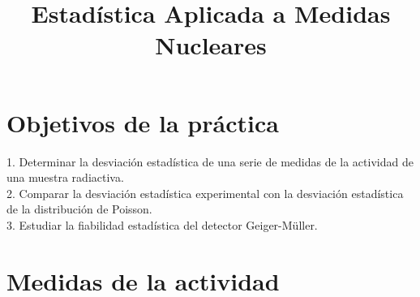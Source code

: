\documentclass[a4paper,12pt,spanish]{article}
\begin{document}
	
	
	\title{Estadística Aplicada a Medidas Nucleares}
	
	\date{}
	
	\maketitle
	
	
	\section{Objetivos de la práctica}
	
	\vspace{\baselineskip}
	
	1. Determinar la desviación estadística de una serie de medidas de la actividad de una muestra radiactiva.\\
	
	2. Comparar la desviación estadística experimental con la desviación estadística de la distribución de Poisson.\\

	3. Estudiar la fiabilidad estadística del detector Geiger-Müller.\\
	
	
	
	\section{Medidas de la actividad}
	
\end{document}
